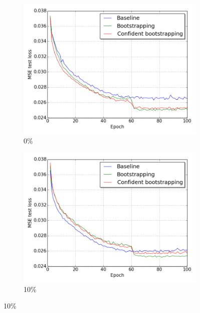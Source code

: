 \begin{figure}[H]
\begin{subfigure}{0.3\textwidth}
\includegraphics[width=\textwidth]{figs/E2/lc_0.png}
\caption{ 0\% } \label{fig:app_E2_0_lc}
\vspace{-0.1cm} %
\end{subfigure}
\hspace*{\fill} %
\begin{subfigure}{0.31\textwidth}
\includegraphics[width=\textwidth]{figs/E2/lc_1.png}
\caption{10\% } \label{fig:app_E2_1_lc}
\vspace{-0.1cm} %

\end{subfigure}
\end{figure}
